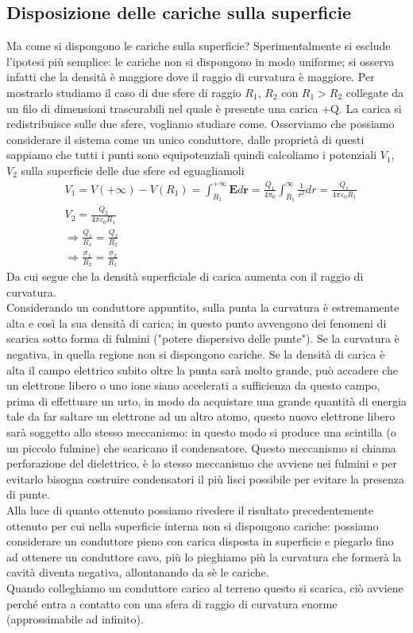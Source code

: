 \documentclass[
10pt, %
a4paper, %
oneside, %
headinclude,footinclude, %
BCOR5mm, %
]{scrartcl}
\begin{document}
\subsection{Disposizione delle cariche sulla superficie}
Ma come si dispongono le cariche sulla superficie? Sperimentalmente si esclude l'ipotesi più semplice: le cariche non si dispongono in modo uniforme; si osserva infatti che la densità è maggiore dove il raggio di curvatura è maggiore. Per mostrarlo studiamo il caso di due sfere di raggio \(R_1\), \(R_2\) con \(R_1>R_2\) collegate da un filo di dimensioni trascurabili nel quale è presente una carica +Q. La carica si redistribuisce sulle due sfere, vogliamo studiare come. Osserviamo che possiamo considerare il sistema come un unico conduttore, dalle proprietà di questi sappiamo che tutti i punti sono equipotenziali quindi calcoliamo i potenziali \(V_1\), \(V_2\) sulla superficie delle due sfere ed eguagliamoli
\begin{align*}
	&V_1 = V(+\infty) - V(R_1) = \int_{R_1}^{+\infty} \mathbf{E}d\mathbf{r} =  \frac{Q_1}{4\pi_0}\int_{R_1}^{\infty}\frac{1}{r^2}dr = \frac{Q_1}{4\pi\varepsilon_0R_1} \\
	&V_2 = \frac{Q_2}{4\pi\varepsilon_0R_1}\\
	&\Rightarrow \frac{Q_1}{R_1}= \frac{Q_2}{R_2}\\
	&\Rightarrow \frac{\sigma_1}{R_2} = \frac{\sigma_2}{R_1}
\end{align*}
Da cui segue che la densità superficiale di carica aumenta con il raggio di curvatura.\\
Considerando un conduttore appuntito, sulla punta la curvatura è estremamente alta e così la sua densità di carica; in questo punto avvengono dei fenomeni di scarica sotto forma di fulmini ("potere dispersivo delle punte"). Se la curvatura è negativa, in quella regione non si dispongono cariche. Se la densità di carica è alta il campo elettrico subito oltre la punta sarà molto grande, può accadere che un elettrone libero o uno ione siano accelerati a sufficienza da questo campo, prima di effettuare un urto, in modo da acquistare una grande quantità di energia tale da far saltare un elettrone ad un altro atomo, questo nuovo elettrone libero sarà soggetto allo stesso meccanismo: in questo modo si produce una scintilla (o un piccolo fulmine) che scaricano il condensatore. Questo meccanismo si chiama perforazione del dielettrico, è lo stesso meccanismo che avviene nei fulmini e per evitarlo bisogna costruire condensatori il più lisci possibile per evitare la presenza di punte.\\
Alla luce di quanto ottenuto possiamo rivedere il risultato precedentemente ottenuto per cui nella superficie interna non si dispongono cariche: possiamo considerare un conduttore pieno con carica disposta in superficie e piegarlo fino ad ottenere un conduttore cavo, più lo pieghiamo più la curvatura che formerà la cavità diventa negativa, allontanando da sè le cariche.\\
Quando colleghiamo un conduttore carico al terreno questo si scarica, ciò avviene perché entra a contatto con una sfera di raggio di curvatura enorme (approssimabile ad infinito). 
\end{document}
